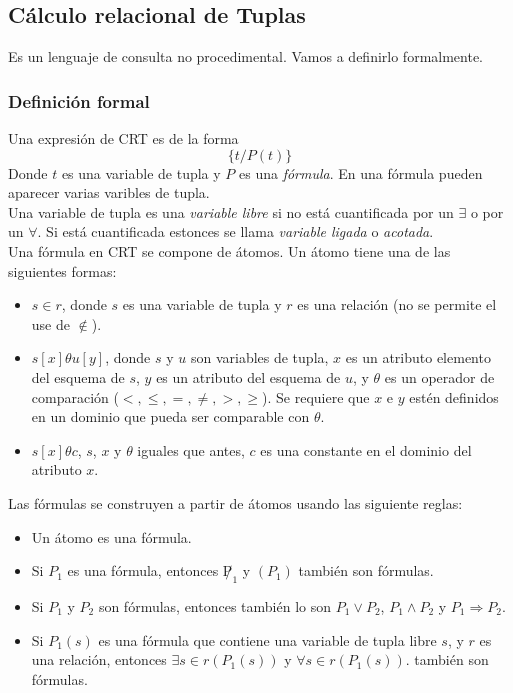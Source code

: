 \documentclass[a4paper]{article}
\begin{document}
\subsection{C\'alculo relacional de Tuplas}
Es un lenguaje de consulta no procedimental. Vamos a definirlo formalmente.
\subsubsection*{Definici\'on formal}
Una expresi\'on de CRT es de la forma
$$ \{ t / P(t) \} $$
Donde $t$ es una variable de tupla y $P$ es una \textit{f\'ormula}. En una f\'ormula pueden
aparecer varias varibles de tupla. \\
Una variable de tupla es una \textit{variable libre} si no est\'a cuantificada por un
$\exists$ o por un $\forall$. Si est\'a cuantificada estonces se llama \textit{variable
ligada} o \textit{acotada}. \\
Una f\'ormula en CRT se compone de \'atomos. Un \'atomo tiene una de las siguientes formas:
\begin{itemize}
    \item $s \in r$, donde $s$ es una variable de tupla y $r$ es una relaci\'on (no se
    permite el use de $\notin$).
    \item $s[x] \theta u[y]$, donde $s$ y $u$ son variables de tupla, $x$ es un atributo
    elemento del esquema de $s$, $y$ es un atributo del esquema de $u$, y $\theta$ es un
    operador de comparaci\'on ($<,\leq,=,\neq,>,\geq$). Se requiere que $x$ e $y$ est\'en
    definidos en un dominio que pueda ser comparable con $\theta$.
    \item $s[x] \theta c$, $s$, $x$ y $\theta$ iguales que antes, $c$ es una constante en el
    dominio del atributo $x$.
\end{itemize}
Las f\'ormulas se construyen a partir de \'atomos usando las siguiente reglas:
\begin{itemize}
    \item Un \'atomo es una f\'ormula.
    \item Si $P_{1}$ es una f\'ormula, entonces $\not P_{1}$ y $(P_{1})$ tambi\'en son
    f\'ormulas.
    \item Si $P_{1}$ y $P_{2}$ son f\'ormulas, entonces tambi\'en lo son $P_{1} \lor P_{2}$,
    $P_{1} \land P_{2}$ y $P_{1} \Rightarrow P_{2}$.
    \item Si $P_{1}(s)$ es una f\'ormula que contiene una variable de tupla libre $s$, y
    $r$ es una relaci\'on, entonces $\exists s \in r (P_{1}(s))$ y $\forall s \in r (P_{1}(s))$.
    tambi\'en son f\'ormulas. 
\end{itemize}
\end{document}

